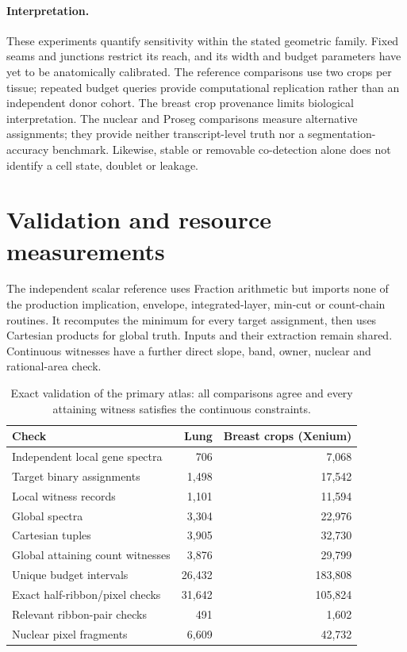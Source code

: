 \documentclass[10pt,letterpaper]{article}
\begin{document}
\paragraph{Interpretation.}
These experiments quantify sensitivity within the stated geometric family. Fixed seams and junctions restrict its reach, and its width and budget parameters have yet to be anatomically calibrated. The reference comparisons use two crops per tissue; repeated budget queries provide computational replication rather than an independent donor cohort. The breast crop provenance limits biological interpretation. The nuclear and Proseg comparisons measure alternative assignments; they provide neither transcript-level truth nor a segmentation-accuracy benchmark. Likewise, stable or removable co-detection alone does not identify a cell state, doublet or leakage.

\FloatBarrier
\section{Validation and resource measurements}
The independent scalar reference uses Fraction arithmetic but imports none of the production implication, envelope, integrated-layer, min-cut or count-chain routines. It recomputes the minimum for every target assignment, then uses Cartesian products for global truth. Inputs and their extraction remain shared. Continuous witnesses have a further direct slope, band, owner, nuclear and rational-area check.

\begin{table}[ht]\centering
\begin{tabular}{lrr}\toprule
Check&Lung&Breast crops (Xenium)\\\midrule
Independent local gene spectra&706&7,068\\
Target binary assignments&1,498&17,542\\
Local witness records&1,101&11,594\\
Global spectra&3,304&22,976\\
Cartesian tuples&3,905&32,730\\
Global attaining count witnesses&3,876&29,799\\
Unique budget intervals&26,432&183,808\\
Exact half-ribbon/pixel checks&31,642&105,824\\
Relevant ribbon-pair checks&491&1,602\\
Nuclear pixel fragments&6,609&42,732\\\bottomrule
\end{tabular}
\caption{Exact validation of the primary atlas: all comparisons agree and every attaining witness satisfies the continuous constraints.}
\end{table}
\end{document}
